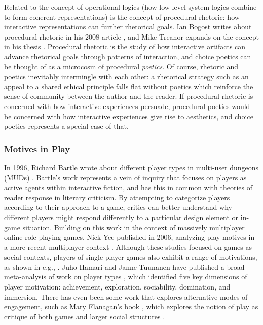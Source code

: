 Related to the concept of operational logics (how low-level system logics combine to form coherent representations) is the concept of procedural rhetoric: how interactive representations can further rhetorical goals.
%
Ian Bogost writes about procedural rhetoric in his 2008 article  \citep{Bogost2008}, and Mike Treanor expands on the concept in his thesis \citep{Treanor2013}.
%
Procedural rhetoric is the study of how interactive artifacts can advance rhetorical goals through patterns of interaction, and choice poetics can be thought of as a microcosm of procedural \emph{poetics}.
%
Of course, rhetoric and poetics inevitably intermingle with each other: a rhetorical strategy such as an appeal to a shared ethical principle falls flat without poetics which reinforce the sense of community between the author and the reader.
%
If procedural rhetoric is concerned with how interactive experiences persuade, procedural poetics would be concerned with how interactive experiences give rise to aesthetics, and choice poetics represents a special case of that.


\subsubsection{Motives in Play}

In 1996, Richard Bartle wrote about different player types in multi-user dungeons (MUDs) \citep{Bartle1996}.
%
Bartle's work represents a vein of inquiry that focuses on players as active agents within interactive fiction, and has this in common with theories of reader response in literary criticism.
%
By attempting to categorize players according to their approach to a game, critics can better understand why different players might respond differently to a particular design element or in-game situation.
%
Building on this work in the context of massively multiplayer online role-playing games, Nick Yee published  in 2006, analyzing play motives in a more recent multiplayer context \citep{Yee2006}.
%
Although these studies focused on games as social contexts, players of single-player games also exhibit a range of motivations, as shown in e.g., \citep{Kallio2011}.
%
Juho Hamari and Janne Tuunanen have published a broad meta-analysis of work on player types \citep{Hamari2014}, which identified five key dimensions of player motivation: achievement, exploration, sociability, domination, and immersion.
%
There has even been some work that explores alternative modes of engagement, such as Mary Flanagan's book , which explores the notion of play as critique of both games and larger social structures \citep{Flanagan2009}.


